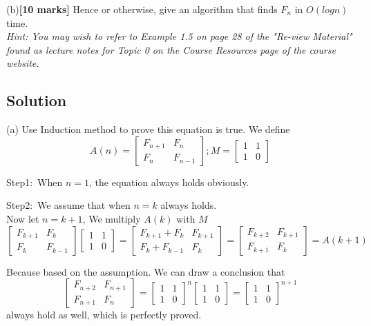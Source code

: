 \documentclass[a4paper,12pt]{article}
\begin{document}
(b)\textbf{[10 marks]}
Hence or otherwise, give an algorithm that finds $F_n$ in $O(logn)$ time.\\
\textit{Hint:  You may wish to refer to Example 1.5 on page 28 of the "Re-view Material" found as lecture notes for Topic 0 on the Course Resources page of the course website.}




\subsection*{Solution}
\setlength{\parindent}{0pt} %

(a) Use Induction method to prove this equation is true.
We define 
\[ A(n) = 
\begin{bmatrix}
F_{n+1} & F_{n}\\
F_{n} & F_{n-1}
\end{bmatrix}
;
M = 
\begin{bmatrix}
1 & 1\\
1 & 0
\end{bmatrix}
\] 

Step1:\ 
When $n = 1$, the equation always holds obviously.

Step2:\ 
We assume that when $n = k$ always holds.\\
Now let $n = k+1$, We multiply $A(k)$ with $M$
\[
\begin{bmatrix}
F_{k+1} & F_{k}\\
F_{k} & F_{k-1}
\end{bmatrix}
\begin{bmatrix}
1 & 1\\
1 & 0
\end{bmatrix}
=
\begin{bmatrix}
F_{k+1} + F_{k} & F_{k+1}\\
F_{k} + F_{k-1} & F_{k}
\end{bmatrix}
=
\begin{bmatrix}
F_{k+2} & F_{k+1}\\
F_{k+1} & F_{k}
\end{bmatrix}
= A(k+1)
 \] 

Because based on the assumption. We can draw a conclusion that 
\[
\begin{bmatrix}
F_{n+2} & F_{n+1}\\
F_{n+1} & F_{n}
\end{bmatrix}
=
\begin{bmatrix}
1 & 1\\
1 & 0
\end{bmatrix}
^n  
\begin{bmatrix}
1 & 1\\
1 & 0
\end{bmatrix}
=
\begin{bmatrix}
1 & 1\\
1 & 0
\end{bmatrix}
^ {n+1}\]
always hold as well, which is perfectly proved.
\end{document}
